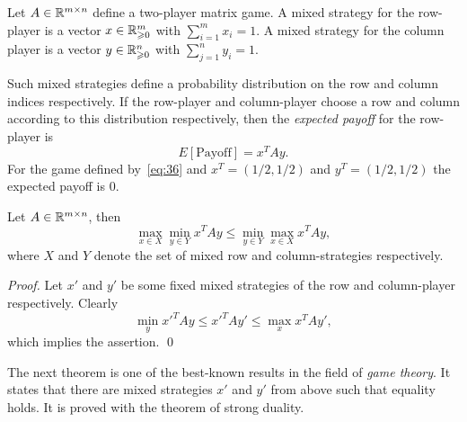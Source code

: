 \begin{definition}
  \label{def:1}
  Let $A \in \mathbb{R}^{m\times n}$ define a two-player matrix game. A mixed
  strategy for the row-player is a vector $x \in \mathbb{R}_{\geqslant0}^m$ with
  $\sum_{i=1}^m x_i = 1$. A mixed strategy for the column player is a
  vector $y \in  \mathbb{R}_{\geqslant0}^n$ with $\sum_{j=1}^n y_i = 1$. 
\end{definition}
%
Such mixed strategies define a probability distribution on the row and
column indices respectively. If the row-player and column-player
choose a row and column according to this distribution respectively,
then the \emph{expected payoff} for the row-player is
\begin{equation}
  \label{eq:37}
  E[\text{Payoff}]=x^TAy. 
\end{equation}
%
For the game defined by~\eqref{eq:36} and $x^T=(1/2,1/2)$ and
$y^T=(1/2,1/2)$ the expected payoff is $0$. 

\begin{lemma}
  \label{d:lem:10}
  Let $A \in \mathbb{R}^{m\times n}$, then 
   \begin{displaymath}
   \max_{x \in X} \min_{y\in Y} x^TA y \leq \min_{y\in Y} \max_{x\in X}
   x^TAy,       
  \end{displaymath}
  where $X$ and $Y$ denote the set of mixed row and column-strategies
  respectively. 
\end{lemma}

\begin{proof}
  Let $x'$ and $y'$  be some fixed mixed strategies of the row and
  column-player  respectively. Clearly 
  \begin{displaymath}
    \min_y {x'}^T A y \leq {x'}^T A y' \leq \max_x {x}^T A y',
  \end{displaymath}
  which implies the assertion. \qed 
\end{proof}


The next theorem is one of the best-known results in the field of
\emph{game theory}. It states that there are mixed strategies $x'$ and
$y'$ from above such that equality holds. It is proved with the
theorem of strong duality. 

